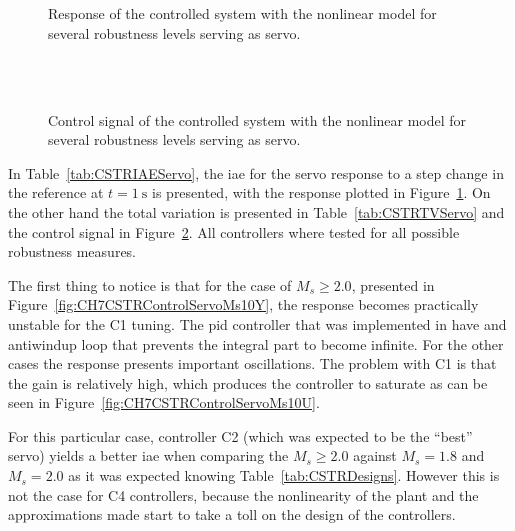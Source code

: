 %
\begin{figure}
	\centering
	\\
	\\
	\caption{Response of the controlled system with the nonlinear model for several robustness levels serving as servo.}
	\label{fig:CH7CSTRControlServoY}
\end{figure}
%
%
\begin{figure}
	\centering
	\\
	\\
	\caption{Control signal of the controlled system with the nonlinear model for several robustness levels serving as servo.}
	\label{fig:CH7CSTRControlServoU}
\end{figure}
%
In Table~\ref{tab:CSTRIAEServo}, the \gls{iae} for the servo response to a step change in the reference at $t= \SI{1}{\second}$ is presented, with the response  plotted in Figure~\ref{fig:CH7CSTRControlServoY}. On the other hand the total variation is presented in Table~\ref{tab:CSTRTVServo} and the control signal in Figure~\ref{fig:CH7CSTRControlServoU}. All controllers where tested for all possible robustness measures.

The first thing to notice is that for the case of $M_s \geq 2.0$, presented in Figure~\ref{fig:CH7CSTRControlServoMs10Y}, the response becomes practically unstable for the C1 tuning. The \gls{pid} controller that was implemented in \simulink have and antiwindup loop that prevents the integral part to become infinite. For the other cases the response presents important oscillations. The problem with C1 is that the gain is relatively high, which produces the controller to saturate as can be seen in Figure~\ref{fig:CH7CSTRControlServoMs10U}.

For this particular case, controller C2 (which was expected to be the ``best'' servo) yields a better \gls{iae} when comparing the $M_s \geq 2.0$ against $M_s = 1.8$ and $M_s = 2.0$ as it was expected knowing Table~\ref{tab:CSTRDesigns}. However this is not the case for C4 controllers, because the nonlinearity of the plant and the approximations made start to take a toll on the design of the controllers.

